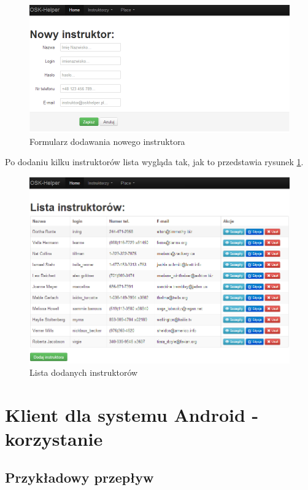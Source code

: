 \documentclass[twoside,a4paper,openright,12pt]{book}
\begin{document}
\begin{figure}[H]
\centering
\includegraphics[width=1\textwidth]{screenshots/panel/nowy_instruktor.png}
\caption{Formularz dodawania nowego instruktora}
\label{fig:Nowy_instruktor}
\end{figure}

\newpage
Po dodaniu kilku instruktorów lista wygląda tak, jak to przedstawia rysunek \ref{fig:Nowy_instruktor}.

\begin{figure}[H]
\centering
\includegraphics[width=1\textwidth]{screenshots/panel/lista_instruktorow.png}
\caption{Lista dodanych instruktorów}
\end{figure}


\chapter{Klient dla systemu Android - korzystanie}

\section{Przykładowy przepływ }
\end{document}
